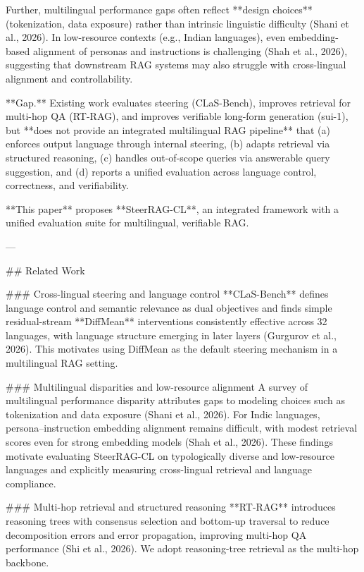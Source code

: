 Further, multilingual performance gaps often reflect **design choices** (tokenization, data exposure) rather than intrinsic linguistic difficulty (Shani et al., 2026). In low-resource contexts (e.g., Indian languages), even embedding-based alignment of personas and instructions is challenging (Shah et al., 2026), suggesting that downstream RAG systems may also struggle with cross-lingual alignment and controllability.

**Gap.** Existing work evaluates steering (CLaS-Bench), improves retrieval for multi-hop QA (RT-RAG), and improves verifiable long-form generation (sui-1), but **does not provide an integrated multilingual RAG pipeline** that (a) enforces output language through internal steering, (b) adapts retrieval via structured reasoning, (c) handles out-of-scope queries via answerable query suggestion, and (d) reports a unified evaluation across language control, correctness, and verifiability.

**This paper** proposes **SteerRAG-CL**, an integrated framework with a unified evaluation suite for multilingual, verifiable RAG.

---

## Related Work

### Cross-lingual steering and language control
**CLaS-Bench** defines language control and semantic relevance as dual objectives and finds simple residual-stream **DiffMean** interventions consistently effective across 32 languages, with language structure emerging in later layers (Gurgurov et al., 2026). This motivates using DiffMean as the default steering mechanism in a multilingual RAG setting.

### Multilingual disparities and low-resource alignment
A survey of multilingual performance disparity attributes gaps to modeling choices such as tokenization and data exposure (Shani et al., 2026). For Indic languages, persona–instruction embedding alignment remains difficult, with modest retrieval scores even for strong embedding models (Shah et al., 2026). These findings motivate evaluating SteerRAG-CL on typologically diverse and low-resource languages and explicitly measuring cross-lingual retrieval and language compliance.

### Multi-hop retrieval and structured reasoning
**RT-RAG** introduces reasoning trees with consensus selection and bottom-up traversal to reduce decomposition errors and error propagation, improving multi-hop QA performance (Shi et al., 2026). We adopt reasoning-tree retrieval as the multi-hop backbone.

